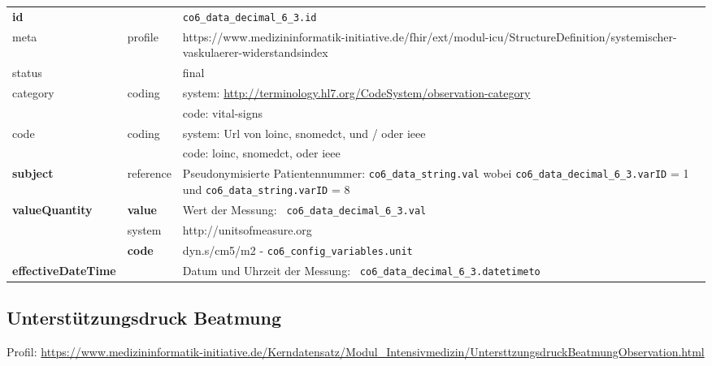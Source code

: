 \begin{longtable}{|l|l|p{7.5cm}|}
	\hline
	\rowcolor{lightgray} \multicolumn{3}{|l|}{Data Mapping (inhaltlich)} \\ \hline
	\textbf{id} &  & \texttt{co6\_data\_decimal\_6\_3.id} \\ \hline
	meta & profile & https://www.medizininformatik-initiative.de/fhir/ext/modul-icu/StructureDefinition/systemischer-vaskulaerer-widerstandsindex \\ \hline 
	status &  & final   \\ \hline 
	category & coding & system: \url{http://terminology.hl7.org/CodeSystem/observation-category} \\
	\cline{3-3}
	& & code: vital-signs \\ \hline
	code & coding & system: Url von \ac{loinc}, \ac{snomedct}, und / oder \ac{ieee} \\ 
	\cline{3-3} 
	&  & code: \ac{loinc}, \ac{snomedct}, oder \ac{ieee} \\ \hline
	\textbf{subject} & reference & Pseudonymisierte Patientennummer: \texttt{co6\_data\_string.val} wobei \texttt{co6\_data\_decimal\_6\_3.varID} = 1 und \texttt{co6\_data\_string.varID} = 8 \\ \hline
	\textbf{valueQuantity}  & \textbf{value} & Wert der Messung: \texttt{
		co6\_data\_decimal\_6\_3.val} \\
	\cline{2-3}
	& system & http://unitsofmeasure.org \\
	\cline{2-3}
	& \textbf{code} & dyn.s/cm5/m2 - \texttt{co6\_config\_variables.unit} \\ \hline
	\textbf{effectiveDateTime}  & & Datum und Uhrzeit der Messung: \texttt{
		co6\_data\_decimal\_6\_3.datetimeto} \\
	\hline
\end{longtable}

\subsection{Unterstützungsdruck Beatmung} 
Profil: \url{https://www.medizininformatik-initiative.de/Kerndatensatz/Modul_Intensivmedizin/UntersttzungsdruckBeatmungObservation.html}

